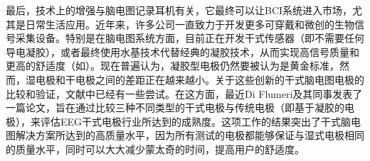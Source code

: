 \documentclass[UTF8,a4paper]{ctexart}
\begin{document}
\par
最后，技术上的增强与脑电图记录耳机有关，它最终可以让BCI系统进入市场，尤其是日常生活应用。近年来，许多公司一直致力于开发更多可穿戴和微创的生物信号采集设备。特别是在脑电图系统方面，目前正在开发干式传感器（即不需要任何导电凝胶），或者最终使用水基技术代替经典的凝胶技术，从而实现高信号质量和更高的舒适度（如\cite{von2017headgear}）。现在普遍认为，凝胶型电极仍然要被认为是黄金标准\cite{tallgren2005evaluation,lopez2014dry}，然而，湿电极和干电极之间的差距正在越来越小\cite{di2019dry}。关于这些创新的干式脑电图电极的比较和验证，文献中已经有一些尝试。在这方面，最近Di Flumeri及其同事\cite{di2019dry}发表了一篇论文，旨在通过比较三种不同类型的干式电极与传统电极（即基于凝胶的电极），来评估EEG干式电极行业所达到的成熟度。这项工作的结果突出了干式脑电图解决方案所达到的高质量水平，因为所有测试的电极都能够保证与湿式电极相同的质量水平，同时可以大大减少蒙太奇的时间，提高用户的舒适度。
\end{document}
